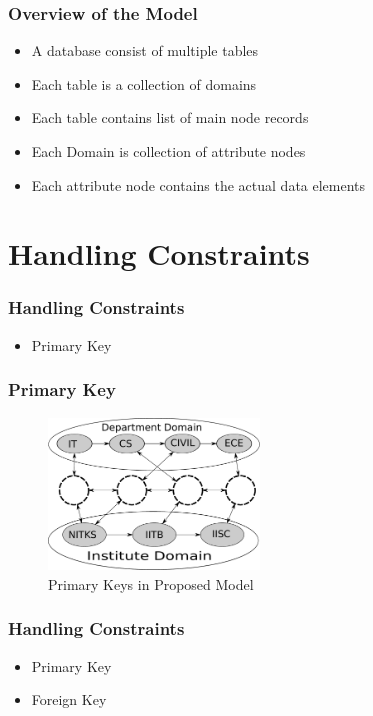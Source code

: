 \documentclass[14pt,xcolor=dvipsnames, aspectratio=169]{beamer}
\begin{document}
\begin{frame}
 \frametitle{Overview of the Model}
 \begin{itemize}
  \item<1-> A database consist of multiple tables
  \item<1-> Each table is a collection of domains
  \item<1-> Each table contains list of main node records
  \item<2-> Each Domain is collection of attribute nodes
  \item<3-> Each attribute node contains the actual data elements
 \end{itemize}
\end{frame}

\section{Handling Constraints}
\begin{frame}
 \frametitle{Handling Constraints}
 \begin{itemize}
  \item Primary Key
 \end{itemize}
\end{frame}

\begin{frame}
 \frametitle{Primary Key}
 \begin{figure}
 \centering
 \includegraphics[width=0.5\textwidth]{pics/primary_key.pdf}
 \caption{Primary Keys in Proposed Model}
 \label{fig:primary_key}
\end{figure}
\end{frame}

\begin{frame}
 \frametitle{Handling Constraints}
 \begin{itemize}
  \item Primary Key
  \item Foreign Key
 \end{itemize}
 \end{frame}
\end{document}
